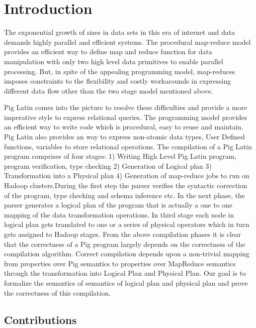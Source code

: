 \section{Introduction}
\label{sec:intro}

{\bf}

The exponential growth of sizes in data sets in this era of internet and data demands highly parallel and efficient systems. The procedural map-reduce model provides an efficient way to define map and reduce function for data manipulation with only two high level data primitives to enable parallel processing. But, in spite of the appealing programming model, map-reduces imposes constraints to the flexibility and costly workarounds in expressing different data flow other than the two stage model mentioned above\cite{olston2008pig}.

Pig Latin comes into the picture to resolve these difficulties and provide a more imperative 
style to express relational queries. The programming model provides an efficient way to write code which is procedural, easy to reuse and maintain. Pig Latin also provides an way to express non-atomic data types, User Defined functions, variables to store relational operations. 
The compilation of a Pig Latin program comprises of four stages: 1) Writing High Level Pig Latin program, program verification, type checking 2) Generation of Logical plan 3) Transformation into a Physical plan 4) Generation of map-reduce jobs to run on Hadoop clusters\cite{gates2009building}.During the first step the parser verifies the syntactic correction of the program, type checking and schema inference etc. In the next phase, the parser generates a logical plan of the program that is actually a one to one mapping of the data transformation operations. In third stage each node in logical plan gets translated to one or a series of physical operators which in turn gets assigned to Hadoop stages.
From the above compilation phases it is clear that the correctness of a Pig program largely depends on the correctness of the compilation algorithm. Correct compilation depends upon a non-trivial mapping from properties over Pig semantics to properties over MapReduce semantics through the transformation into Logical Plan and Physical Plan. Our goal is to formalize the semantics of semantics of logical plan and physical plan and prove the correctness of this compilation.

\subsection{Contributions}
\label{subsec:contrib}

